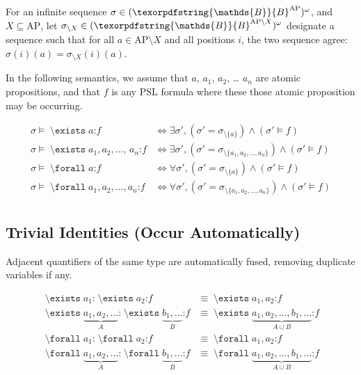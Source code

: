 \documentclass[a4paper,twoside,10pt,DIV=12]{scrreprt}
\newcommand{\B}{\texorpdfstring{\ensuremath{\mathds{B}}}{B}}
\newcommand{\AP}{\ensuremath{\mathrm{AP}}}
\newcommand{\COLON}{\mathbin{\texttt{:}}}
\newcommand{\COMMA}{\mathbin{\texttt{,}}}
\newcommand{\0}{\texttt{0}}
\newcommand{\1}{\texttt{1}}
\DeclareMathOperator{\EXISTS}{\texttt{\textbackslash{}exists}}
\DeclareMathOperator{\FORALL}{\texttt{\textbackslash{}forall}}
\begin{document}
For an infinite sequence $\sigma\in (\B^\AP)^\omega$, and
$X\subseteq\AP$, let $\sigma_{\setminus X}\in (\B^{\AP\setminus X})^\omega$
designate a sequence such that for all $a\in\AP\setminus X$ and all
positions $i$, the two sequence agree: $\sigma(i)(a) = \sigma_{\setminus X}(i)(a)$.


In the following semantics, we assume that $a$, $a_1$, $a_2$, \ldots
$a_n$ are atomic propositions, and that $f$ is any PSL formula where
these those atomic proposition may be occurring.


\begin{align*}
  \sigma\vDash \EXISTS a \COLON f &\iff \exists \sigma', (\sigma'=\sigma_{\setminus\{a\}})\land(\sigma' \vDash f) \\
  \sigma\vDash \EXISTS a_1\COMMA\,a_2\COMMA\,\ldots,\,a_n \COLON f &\iff \exists \sigma', (\sigma'=\sigma_{\setminus\{a_1,a_2,\ldots, a_n\}})\land(\sigma' \vDash f) \\
  \sigma\vDash \FORALL a \COLON f &\iff \forall \sigma', (\sigma'=\sigma_{\setminus\{a\}})\land(\sigma' \vDash f) \\
  \sigma\vDash \FORALL a_1\COMMA\,a_2\COMMA\,\ldots\COMMA\,a_n \COLON f &\iff \forall \sigma', (\sigma'=\sigma_{\setminus\{a_1,a_2,\ldots, a_n\}})\land(\sigma' \vDash f) \\
\end{align*}

\subsection{Trivial Identities (Occur Automatically)}\label{sec:quant-trivial}

Adjacent quantifiers of the same type are automatically fused,
removing duplicate variables if any.

\begin{align*}
  \EXISTS a_1 \COLON \EXISTS a_2 \COLON f &\equiv \EXISTS a_1\COMMA\, a_2 \COLON f \\
  \EXISTS \underbrace{a_1\COMMA\,a_2\COMMA\,\ldots}_A \COLON \EXISTS \underbrace{b_1\COMMA\,\ldots}_B \COLON f &\equiv
  \EXISTS \underbrace{a_1\COMMA\,a_2\COMMA\,\ldots\COMMA\,b_1\COMMA\,\ldots}_{A \cup B} \COLON f \\
  \FORALL a_1 \COLON \FORALL a_2 \COLON f &\equiv \FORALL a_1\COMMA\, a_2 \COLON f \\
  \FORALL \underbrace{a_1\COMMA\,a_2\COMMA\,\ldots}_A \COLON \FORALL \underbrace{b_1\COMMA\,\ldots}_B \COLON f &\equiv
  \FORALL \underbrace{a_1\COMMA\,a_2\COMMA\,\ldots\COMMA\,b_1\COMMA\,\ldots}_{A \cup B} \COLON f \\
\end{align*}
\end{document}
